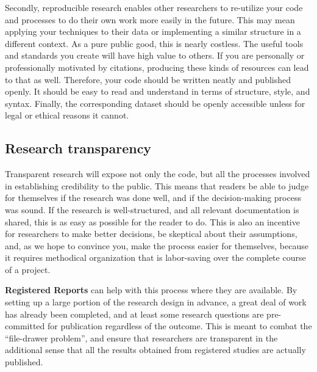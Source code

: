 Secondly, reproducible research
enables other researchers to re-utilize your code and processes
to do their own work more easily in the future.
This may mean applying your techniques to their data
or implementing a similar structure in a different context.
As a pure public good, this is nearly costless.
The useful tools and standards you create will have high value to others.
If you are personally or professionally motivated by citations,
producing these kinds of resources can lead to that as well.
Therefore, your code should be written neatly and published openly.
It should be easy to read and understand in terms of structure, style, and syntax.
Finally, the corresponding dataset should be openly accessible
unless for legal or ethical reasons it cannot.

\subsection{Research transparency}

Transparent research will expose not only the code, but all the processes involved in establishing credibility to the public.
This means that readers be able to judge for themselves if the research was done well,
and if the decision-making process was sound.
If the research is well-structured, and all relevant documentation is shared,
this is as easy as possible for the reader to do.
This is also an incentive for researchers to make better decisions,
be skeptical about their assumptions,
and, as we hope to convince you, make the process easier for themselves,
because it requires methodical organization that is labor-saving over the complete course of a project.

\textbf{Registered Reports} can help with this process where they are available.
By setting up a large portion of the research design in advance,
a great deal of work has already been completed,
and at least some research questions are pre-committed for publication regardless of the outcome.
This is meant to combat the ``file-drawer problem'',\cite{simonsohn2014p}
and ensure that researchers are transparent in the additional sense that
all the results obtained from registered studies are actually published.

